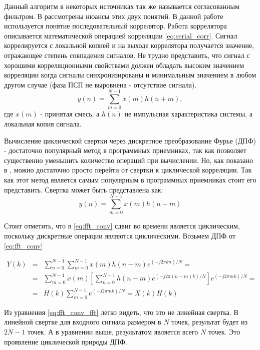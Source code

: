 Данный алгоритм в некоторых источниках так же называется согласованным фильтром. В \cite{sklyar} рассмотрены нюансы этих двух понятий.
В данной работе используется понятие последовательный коррелятор. Работа коррелятора описывается математической операцией
корреляции \ref{eq:serial_corr}. Сигнал коррелируется с локальной копией и на выходе коррелятора получается значение, отражающее
степень совпадения сигналов. Не трудно представить, что сигнал с хорошими корреляционными свойствами должен обладать высоким значением
корреляции когда сигналы синхронизированы и минимальным значением в любом другом случае (фаза ПСП не выровнена - отсутствие сигнала).
\begin{equation}
	\label{eq:serial_corr}
	y(n)=\sum\limits_{m=0}^{N-1}{x(m)h(n+m)},
\end{equation}
где ${x(m)}$ - принятая смесь, а ${h(n)}$ не импульсная характеристика системы, а локальная копия сигнала.


Вычисление циклической свертки через дискретное преобразование Фурье (ДПФ) - достаточно популярный метод
в программных приемниках, так как позволяет существенно уменьшить количество операций при вычислении. Но, как показано
в \cite{tsui, oppenheim}, можно достаточно просто перейти от свертки к циклической корреляции. Так как этот метод является самым
популярным в программных приемниках стоит его представить.
Свертка может быть представлена как:
\begin{equation}
	\label{eq:fft_conv}
	y(n)=\sum\limits_{m=0}^{N-1}{x(m)h(n-m)}
\end{equation}

Стоит отметить, что в \ref{eq:fft_conv} сдвиг во времени является циклическим, поскольку дискретные операции являются циклическими.
Возьмем ДПФ от \ref{eq:fft_conv}
\begin{center}
\begin{eqnarray}
	\label{eq:fft_conv_fft}
	Y(k) & = & \sum\limits_{n=0}^{N-1}\sum\limits_{m=0}^{N-1}{x(m)h(n-m)e^{(-j2\pi{kn})/N}}=\nonumber \\
	& = & \sum\limits_{m=0}^{N-1}{x(m)}[\sum\limits_{n=0}^{N-1}h(n-m)e^{(-j2\pi{(n-m)}k)/N}]e^{(-j2\pi{m}k)/N}=\\
	& = & H(k)\sum\limits_{m=0}^{N-1}e^{(-j2\pi{m}k)/N} = X(k)H(k)\nonumber 
\end{eqnarray}
\end{center}
Из уравнения \ref{eq:fft_conv_fft} легко видеть, что это не линейная свертка. В линейной свертке для входного сигнала размером в ${N}$ точек,
результат будет из ${2N-1}$ точек. А в уравнении выше, результатом является всего ${N}$ точек.
Это проявление циклической природы ДПФ.

